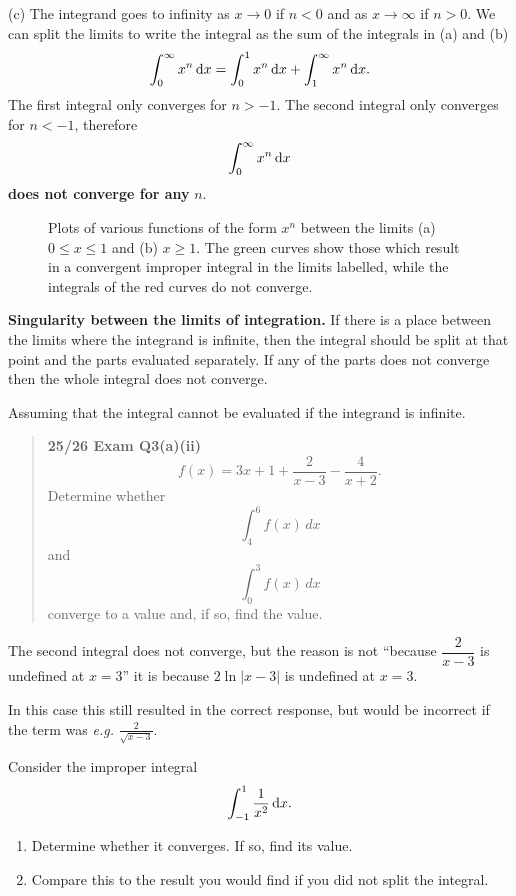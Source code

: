 (c) The integrand goes to infinity as $x\to0$ if $n<0$ and as $x\to\infty$ if $n>0$. We can split the limits to write the integral as the sum of the integrals in (a) and (b)
\[
\int_0^\infty x^n\,{\rm d}x
=\int_0^1x^n\,{\rm d}x+\int_1^\infty x^n\,{\rm d}x.
\]
The first integral only converges for $n>-1$. The second integral only converges for $n<-1$, therefore
\[
\int_0^\infty x^n\,{\rm d}x
\]
\textbf{does not converge for any} $n$.

\begin{figure}[ht]
\centering
    \hfill
    \caption{Plots of various functions of the form $x^n$ between the limits (a) $0 \leq x \leq 1$ and (b) $x \geq 1$. The green curves show those which result in a convergent improper integral in the limits labelled, while the integrals of the red curves do not converge.}
    \label{fig:xpown_improper}
\end{figure}

\textbf{Singularity between the limits of integration.} If there is a place between the limits where the integrand is infinite, then the integral should be split at that point and the parts evaluated separately. If any of the parts does not converge then the whole integral does not converge.


\begin{exammistake} 
Assuming that the integral cannot be evaluated if the integrand is infinite. 
\begin{quote}
    \textbf{25/26 Exam Q3(a)(ii)} \[ f(x)=3x+1+\frac{2}{x-3}-\frac{4}{x+2}. \] Determine whether \[ \int_4^6 f(x)\,dx \] and \[ \int_0^3 f(x)\,dx \] converge to a value and, if so, find the value.
\end{quote}
The second integral does not converge, but the reason is not ``because \(\dfrac{2}{x-3}\) is undefined at \(x=3\)'' it is because \(2\ln|x-3|\) is undefined at \(x=3\). 

In this case this still resulted in the correct response, but would be incorrect if the term was \textit{e.g.} $\frac{2}{\sqrt{x-3}}$.
\end{exammistake}

\begin{example}[Lecture]
Consider the improper integral
\[
\int_{-1}^1\frac{1}{x^2}\,{\rm d}x.
\]
\begin{enumerate}
\item[(a)] Determine whether it converges. If so, find its value.
\item[(b)] Compare this to the result you would find if you did not split the integral.
\end{enumerate}
\end{example}

